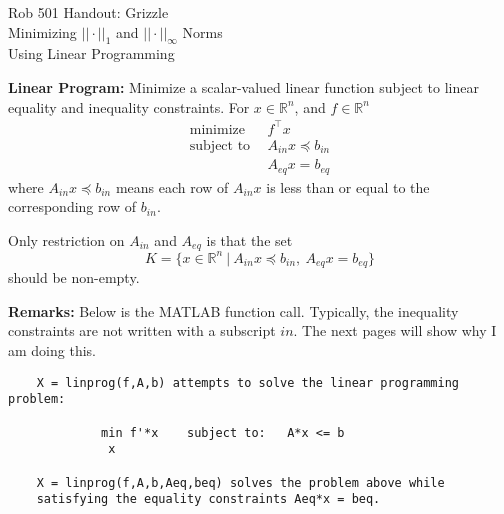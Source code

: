 \documentclass[letterpaper]{article}
\newcommand{\real}{\mathbb R}  %
\begin{document}
\baselineskip=48pt  %


\setlength{\parskip}{.3in}
\setlength{\itemsep}{.3in}

\pagestyle{plain}

{\Large \bf
\begin{center}
Rob 501 Handout: Grizzle \\
Minimizing $||\cdot||_1$ and $||\cdot||_\infty$ Norms\\
Using Linear Programming
\end{center}
}



\Large

\noindent \textbf{Linear Program:} Minimize a scalar-valued linear function subject to linear equality and inequality constraints. For $x \in \real^n$, and $f \in \real^n$
\begin{align*}
\text{minimize}& ~~ f^\top x\\
\text{subject to} &~~A_{in} x \preceq b_{in} \\
 & ~~A_{eq} x = b_{eq}
\end{align*}
where $A_{in} x \preceq b_{in}$ means each row of $A_{in}x$ is less than or equal to the corresponding row of $b_{in}$.

Only restriction on $A_{in}$ and $A_{eq}$ is that the set 
$$K=\{ x \in \real^n~|~ A_{in} x \preceq b_{in},~ A_{eq} x = b_{eq} \}$$
should be non-empty.

\vspace*{2cm}
\noindent \textbf{Remarks:} Below is the MATLAB function call. Typically, the inequality constraints are not written with a subscript ${in}$. The next pages will show why I am doing this.
\begin{verbatim}
    X = linprog(f,A,b) attempts to solve the linear programming problem:

             min f'*x    subject to:   A*x <= b
              x

    X = linprog(f,A,b,Aeq,beq) solves the problem above while 
    satisfying the equality constraints Aeq*x = beq.
\end{verbatim}
\end{document}
